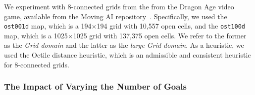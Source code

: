 \documentclass[smallextended]{svjour3}       %
\begin{document}


We experiment with 8-connected grids from the from the Dragon Age video game, available from the Moving AI repository~\cite{sturtevant2012benchmarks}. 
Specifically, we used the \texttt{ost001d} map, which is a 194$\times$194 grid with 10,557 open cells, 
and the \texttt{ost100d} map, which is a 1025$\times$1025 grid with 137,375 open cells. 
We refer to the former as the \emph{Grid domain} 
and the latter as the \emph{large Grid domain}. 
As a heuristic, we used the Octile distance heuristic, which is an admissible and consistent heuristic for 8-connected grids. 




\subsubsection{The Impact of Varying the Number of Goals}
\end{document}
